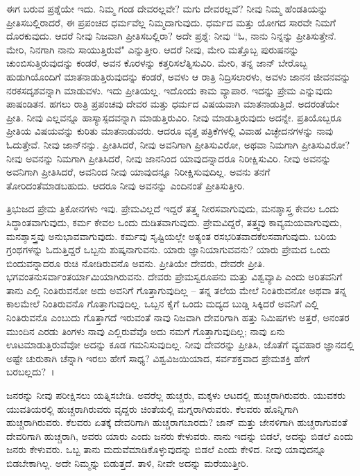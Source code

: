 ಈಗ ಬರುವ ಪ್ರಶ್ನೆಯೇ ಇದು. ನಿಮ್ಮ ಗಂಡ ದೇವರಲ್ಲವೇ? ಮಗು ದೇವರಲ್ಲವೆ? ನೀವು ನಿಮ್ಮ ಹೆಂಡತಿಯನ್ನು ಪ್ರೀತಿಸಬಲ್ಲಿರಾದರೆ, ಈ ಪ್ರಪಂಚದ ಧರ್ಮವೆಲ್ಲ ನಿಮ್ಮದಾಗುವುದು. ಧರ್ಮದ ಮತ್ತು ಯೋಗದ ಸಾರವೇ ನಿಮಗೆ ದೊರಕುವುದು. ಆದರೆ ನೀವು ನಿಜವಾಗಿ ಪ್ರೀತಿಸಬಲ್ಲಿರಾ? ಅದೇ ಪ್ರಶ್ನೆ: ನೀವು “ಓ, ನಾನು ನಿನ್ನನ್ನು ಪ್ರೀತಿಸುತ್ತೇನೆ. ಮೇರಿ, ನಿನಗಾಗಿ ನಾನು ಸಾಯುತ್ತಿರುವೆ" ಎನ್ನುತ್ತೀರಿ. ಆದರೆ ನೀವು, ಮೇರಿ ಮತ್ತೊಬ್ಬ ಪುರುಷನನ್ನು ಚುಂಬಿಸುತ್ತಿರುವುದನ್ನು ಕಂಡರೆ, ಅವನ ಕೊರಳನ್ನು ಕತ್ತರಿಸಲೆತ್ನಿಸುವಿರಿ. ಮೇರಿ, ತನ್ನ ಜಾನ್ ಬೇರೊಬ್ಬ ಹುಡುಗಿಯೊಂದಿಗೆ ಮಾತನಾಡುತ್ತಿರುವುದನ್ನು ಕಂಡರೆ, ಅವಳು ಆ ರಾತ್ರಿ ನಿದ್ರಿಸಲಾರಳು, ಅವಳು ಜಾನನ ಜೀವನವನ್ನು ನರಕಸದೃಶವನ್ನಾಗಿ ಮಾಡುವಳು. ಇದು ಪ್ರೀತಿಯಲ್ಲ. ಇದೊಂದು ಕಾಮ ವ್ಯಾಪಾರ. ಇದನ್ನು ಪ್ರೇಮ ಎನ್ನುವುದು ಪಾಷಂಡಿತನ. ಹಗಲು ರಾತ್ರಿ ಪ್ರಪಂಚವು ದೇವರ ಮತ್ತು ಧರ್ಮದ ವಿಷಯವಾಗಿ ಮಾತನಾಡುತ್ತಿದೆ. ಅದರಂತೆಯೇ ಪ್ರೀತಿ. ನೀವು ಎಲ್ಲವನ್ನೂ ಹಾಸ್ಯಾಸ್ಪದವನ್ನಾಗಿ ಮಾಡುತ್ತಿರುವಿರಿ. ನೀವು ಮಾಡುತ್ತಿರುವುದು ಅದನ್ನೇ. ಪ್ರತಿಯೊಬ್ಬರೂ ಪ್ರೀತಿಯ ವಿಷಯವನ್ನು ಕುರಿತು ಮಾತನಾಡುವರು. ಆದರೂ ವೃತ್ತ ಪತ್ರಿಕೆಗಳಲ್ಲಿ ವಿವಾಹ ವಿಚ್ಛೇದನಗಳನ್ನು ನಾವು ಓದುತ್ತೇವೆ. ನೀವು ಜಾನ್‌ನನ್ನು. ಪ್ರೀತಿಸಿದರೆ, ನೀವು ಅವನಿಗಾಗಿ ಪ್ರೀತಿಸುವಿರೋ, ಅಥವಾ ನಿಮಗಾಗಿ ಪ್ರೀತಿಸುವಿರೋ? ನೀವು ಅವನನ್ನು ನಿಮಗಾಗಿ ಪ್ರೀತಿಸಿದರೆ, ನೀವು ಜಾನನಿಂದ ಯಾವುದನ್ನಾದರೂ ನಿರೀಕ್ಷಿಸುವಿರಿ. ನೀವು ಅವನನ್ನು ಅವನಿಗಾಗಿ ಪ್ರೀತಿಸಿದರೆ, ಅವನಿಂದ ನೀವು ಯಾವುದನ್ನೂ ನಿರೀಕ್ಷಿಸುವುದಿಲ್ಲ. ಅವನು ತನಗೆ ತೋರಿದಂತೆ\break ಮಾಡಬಹುದು. ಆದರೂ ನೀವು ಅವನನ್ನು ಎಂದಿನಂತೆ ಪ್ರೀತಿಸುತ್ತೀರಿ.

ತ್ರಿಭುಜದ ಪ್ರೇಮ ತ್ರಿಕೋನಗಳು ಇವು. ಪ್ರೇಮವಿಲ್ಲದೆ ಇದ್ದರೆ ತತ್ತ್ವ ನೀರಸ\-ವಾಗುವುದು, ಮನಶ್ಶಾಸ್ತ್ರ ಕೇವಲ ಒಂದು ಸಿದ್ಧಾಂತವಾಗುವುದು, ಕರ್ಮ ಕೇವಲ ಒಂದು ದುಡಿತವಾಗುವುದು. ಪ್ರೇಮವಿದ್ದರೆ, ತತ್ತ್ವವು ಕಾವ್ಯಮಯವಾಗುವುದು, ಮನಶ್ಶಾಸ್ತ್ರವು ಅನುಭಾವವಾಗುವುದು. ಕರ್ಮವು ಸೃಷ್ಟಿಯಲ್ಲೇ ಅತ್ಯಂತ ರಸಭರಿತವಾದ\break ಕೆಲಸವಾಗುವುದು. ಬರಿಯ ಗ್ರಂಥಗಳನ್ನು ಓದುತ್ತಿದ್ದರೆ ಒಬ್ಬನು ಶುಷ್ಕನಾಗುವನು. ಯಾರು ಜ್ಞಾನಿಯಾಗುವವನು? ಯಾರು ಪ್ರೇಮದ ಒಂದು ಬಿಂದುವನ್ನಾದರೂ ರುಚಿ ನೋಡಿರುವನೊ ಅವನು. ಪ್ರೀತಿಯೇ ದೇವರು, ದೇವರೇ ಪ್ರೀತಿ. ಭಗವಂತನು\break ಸರ್ವಾಂತರ್ಯಾಮಿಯಾಗಿರುವನು. ದೇವರು ಪ್ರೇಮಸ್ವರೂಪನು ಮತ್ತು ವಿಶ್ವವ್ಯಾಪಿ ಎಂದು ಅರಿತವನಿಗೆ ತಾನು ಎಲ್ಲಿ ನಿಂತಿರುವನೋ ಅದು ಅವನಿಗೆ ಗೊತ್ತಾಗುವುದಿಲ್ಲ – ತನ್ನ ತಲೆಯ ಮೇಲೆ ನಿಂತಿರುವನೋ ಅಥವಾ ತನ್ನ ಕಾಲಮೇಲೆ ನಿಂತಿರುವನೊ ಗೊತ್ತಾಗುವುದಿಲ್ಲ. ಒಬ್ಬನ ಕೈಗೆ ಒಂದು ಮದ್ಯದ ಬುಡ್ಡಿ ಸಿಕ್ಕಿದರೆ ಅವನಿಗೆ ಎಲ್ಲಿ ನಿಂತಿರುವನೊ ಎಂಬುದು ಗೊತ್ತಾಗದೆ ಇರುವಂತೆ ನಾವು ನಿಜವಾಗಿ ದೇವರಿಗಾಗಿ ಹತ್ತು ನಿಮಿಷಗಳು ಅತ್ತರೆ, ಅನಂತರ ಮುಂದಿನ ಎರಡು ತಿಂಗಳು ನಾವು ಎಲ್ಲಿರುವೆವೊ ಅದು ನಮಗೆ ಗೊತ್ತಾಗುವುದಿಲ್ಲ; ನಾವು ಏನು ಊಟಮಾಡುತ್ತಿರುವೆವೋ ಅದನ್ನು ಕೂಡ ಗಮನಿಸುವುದಿಲ್ಲ. ನೀವು ದೇವರನ್ನು ಪ್ರೀತಿಸಿ, ಜೊತೆಗೆ ವ್ಯವಹಾರ ಜ್ಞಾನದಲ್ಲಿ ಅಷ್ಟೇ ಚುರುಕಾಗಿ ಚೆನ್ನಾಗಿ ಇರಲು ಹೇಗೆ ಸಾಧ್ಯ? ವಿಶ್ವವಿಜಯಿಯಾದ, ಸರ್ವಶಕ್ತವಾದ ಪ್ರೇಮಶಕ್ತಿ ಹೇಗೆ ಬರಬಲ್ಲದು?~।

ಜನರನ್ನು ನೀವು ಪರೀಕ್ಷಿಸಲು ಯತ್ನಿಸಬೇಡಿ. ಅವರೆಲ್ಲ ಹುಚ್ಚರು, ಮಕ್ಕಳು ಆಟದಲ್ಲಿ ಹುಚ್ಚರಾಗಿರುವರು. ಯುವಕರು ಯುವತಿಯರಲ್ಲಿ ಹುಚ್ಚರಾಗಿರುವರು ವೃದ್ದರು ಚಿಂತೆಯಲ್ಲಿ ಮಗ್ನರಾಗಿರುವರು. ಕೆಲವರು ಹೊನ್ನಿಗಾಗಿ ಹುಚ್ಚರಾಗಿರುವರು. ಕೆಲವರು ಏತಕ್ಕೆ ದೇವರಿಗಾಗಿ ಹುಚ್ಚರಾಗಬಾರದು? ಜಾನ್ ಮತ್ತು ಜೇನಳಿಗಾಗಿ ಹುಚ್ಚರಾಗುವಂತೆ ದೇವರಿಗಾಗಿ ಹುಚ್ಚರಾಗಿ, ಅವರು ಯಾರು ಎಂದು ಜನರು ಕೇಳುವರು. ನಾನು ಇದನ್ನು ಬಿಡಲೆ, ಅದನ್ನು ಬಿಡಲೆ ಎಂದು ಜನರು ಕೇಳುವರು. ಒಬ್ಬ ತಾನು ಮದುವೆಮಾಡಿಕೊಳ್ಳುವುದನ್ನು ಬಿಡಲೆ ಎಂದು ಕೇಳಿದ. ನೀವು ಯಾವುದನ್ನೂ ಬಿಡಬೇಕಾಗಿಲ್ಲ. ಅದೇ ನಿಮ್ಮನ್ನು ಬಿಡುತ್ತದೆ. ತಾಳಿ, ನೀವೇ ಅದನ್ನು ಮರೆಯುತ್ತೀರಿ.

